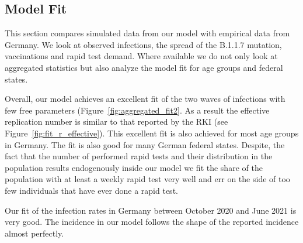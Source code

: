 \subsection{Model Fit}
\label{subsec:fit_results}


This section compares simulated data from our model with empirical data from Germany. We
look at observed infections, the spread of the B.1.1.7 mutation,
vaccinations and rapid test demand. Where available we do not
only look at aggregated statistics but also analyze the model fit for age groups and
federal states.

Overall, our model achieves an excellent fit of the two waves of infections with few free
parameters (Figure~\ref{fig:aggregated_fit2}. As a result the effective replication
number is similar to that reported by the RKI (see Figure~\ref{fig:fit_r_effective}).
This excellent fit is also achieved for most age groups in Germany. The fit is also good
for many German federal states. Despite, the fact that the number of performed rapid
tests and their distribution in the population results endogenously inside our model we
fit the share of the population with at least a weekly rapid test very well and err on
the side of too few individuals that have ever done a rapid test.

Our fit of the infection rates in Germany between October 2020 and June 2021 is very
good. The incidence in our model follows the shape of the reported incidence almost
perfectly. %

